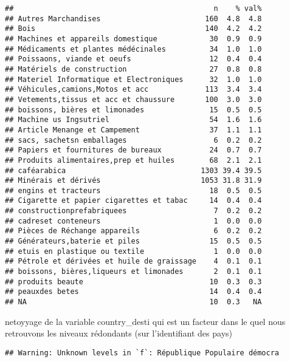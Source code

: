 \documentclass[
]{book}
\begin{document}
\begin{verbatim}
##                                              n    % val%
## Autres Marchandises                        160  4.8  4.8
## Bois                                       140  4.2  4.2
## Machines et appareils domestique            30  0.9  0.9
## Médicaments et plantes médécinales          34  1.0  1.0
## Poissaons, viande et oeufs                  12  0.4  0.4
## Matériels de construction                   27  0.8  0.8
## Materiel Informatique et Electroniques      32  1.0  1.0
## Véhicules,camions,Motos et acc             113  3.4  3.4
## Vetements,tissus et acc et chaussure       100  3.0  3.0
## boissons, bières et limonades               15  0.5  0.5
## Machine us Ingsutriel                       54  1.6  1.6
## Article Menange et Campement                37  1.1  1.1
## sacs, sachetsn emballages                    6  0.2  0.2
## Papiers et fournitures de bureaux           24  0.7  0.7
## Produits alimentaires,prep et huiles        68  2.1  2.1
## caféarabica                               1303 39.4 39.5
## Minérais et dérivés                       1053 31.8 31.9
## engins et tracteurs                         18  0.5  0.5
## Cigarette et papier cigarettes et tabac     14  0.4  0.4
## constructionprefabriquees                    7  0.2  0.2
## cadreset conteneurs                          1  0.0  0.0
## Pièces de Réchange appareils                 6  0.2  0.2
## Générateurs,baterie et piles                15  0.5  0.5
## etuis en plastique ou textile                1  0.0  0.0
## Pétrole et dérivées et huile de graissage    4  0.1  0.1
## boissons, bières,liqueurs et limonades       2  0.1  0.1
## produits beaute                             10  0.3  0.3
## peauxdes betes                              14  0.4  0.4
## NA                                          10  0.3   NA
\end{verbatim}

netoyyage de la variable country\_desti qui est un facteur dans le quel nous retrouvons les niveaux rédondants (sur l'identifiant des pays)

\begin{verbatim}
## Warning: Unknown levels in `f`: République Populaire démocra
\end{verbatim}
\end{document}
